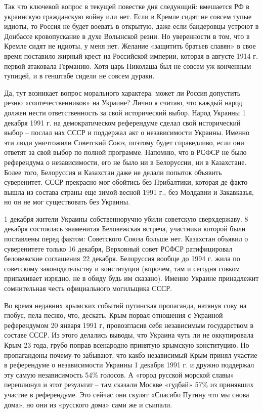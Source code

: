  Так что ключевой вопрос в текущей повестке дня следующий: вмешается РФ в
украинскую гражданскую войну или нет. Если в Кремле сидят не совсем тупые
идиоты, то Россия не будет воевать в открытую, даже если бандеровцы устроют в
Донбассе кровопускание в духе Волынской резни. Но уверенности в том, что в
Кремле сидят не идиоты, у меня нет. Желание «защитить братьев славян» в свое
время поставило жирный крест на Российской империи, которая в августе 1914 г.
первой атаковала  Германию. Хотя царь Николаша был не совсем уж конченным
тупицей, и в генштабе сидели не совсем дураки.

Да, тут возникает вопрос морального характера: может ли Россия допустить резню
«соотечественников» на Украине? Лично я считаю, что каждый народ должен нести
ответственность за свой исторический выбор. Народ Украины 1 декабря 1991 г. на
демократическом референдуме сделал свой исторический выбор – послал нах СССР и
поддержал акт о независимости Украины. Именно эти люди уничтожили Советский
Союз, поэтому будет справедливо, если они  ответят за свой выбор по полной
программе. Напомню, что в РСФСР не было референдума о независимости, его не
было ни в Белоруссии, ни в Казахстане. Более того, Белоруссия и Казахстан даже
не делали попыток объявить суверенитет. СССР прекрасно мог обойтись без
Прибалтики, которая де факто вышла из состава страны еще зимой-весной 1991 г.,
без Молдавии и  Закавказья, но он не мог существовать без Украины.

1 декабря жители Украины собственноручно убили советскую сверхдержаву. 8
декабря состоялась знаменитая Беловежская встреча, участники которой были
поставлены перед фактом: Советского Союза больше нет. Казахстан объявил о
суверенитете только 16 декабря, Верховный совет РСФСР ратифицировал беловежские
соглашения 22 декабря. Белоруссия вообще до 1994 г. жила по советскому
законодательству и конституции (впрочем, там и сегодня совком припахивает
изрядно, не в обиду будь им сказано). Именно Украине принадлежит сомнительная
честь официального могильщика СССР.

Во время недавних крымских событий путинская пропаганда, натянув сову на
глобус, пела песню, что, дескать, Крым порвал отношения с Украиной референдумом
20 января 1991 г, провозгласив себя независимым государством в составе СССР. Из
этого делались выводы, что Украина чуть ли не оккупировала Крым 23 года, грубо
поправ всенародно принятую крымскую конституцию. Но пропагандоны почему-то
забывают, что какбэ независимый Крым принял участие в референдуме о
независимости Украины 1 декабря 1991 г. и дружно поддержал эту самую
независимость 54\% голосов. А «город русской морской славы» переплюнул и этот
результат – там сказали Москве «гудбай» 57\% из принявших участие в референдуме.
Это сейчас они скулят «Спасибо Путину что мы снова дома», но они из «русского
дома» сами же и съипали.

